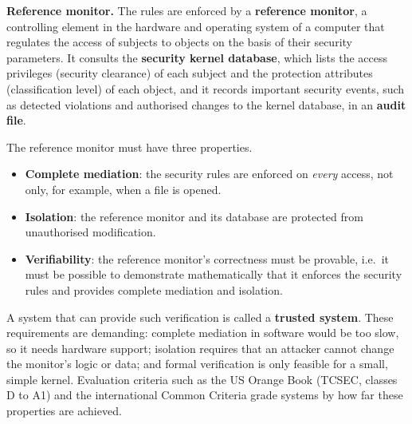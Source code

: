 \textbf{Reference monitor.} The rules are enforced by a \textbf{reference monitor}, a controlling element in the hardware and operating system of a computer that regulates the access of subjects to objects on the basis of their security parameters. It consults the \textbf{security kernel database}, which lists the access privileges (security clearance) of each subject and the protection attributes (classification level) of each object, and it records important security events, such as detected violations and authorised changes to the kernel database, in an \textbf{audit file}.
\begin{center}
\end{center}
The reference monitor must have three properties.
\begin{itemize}
  \item \textbf{Complete mediation}: the security rules are enforced on \emph{every} access, not only, for example, when a file is opened.
  \item \textbf{Isolation}: the reference monitor and its database are protected from unauthorised modification.
  \item \textbf{Verifiability}: the reference monitor's correctness must be provable, i.e.\ it must be possible to demonstrate mathematically that it enforces the security rules and provides complete mediation and isolation.
\end{itemize}
A system that can provide such verification is called a \textbf{trusted system}. These requirements are demanding: complete mediation in software would be too slow, so it needs hardware support; isolation requires that an attacker cannot change the monitor's logic or data; and formal verification is only feasible for a small, simple kernel. Evaluation criteria such as the US Orange Book (TCSEC, classes D to A1) and the international Common Criteria grade systems by how far these properties are achieved.

